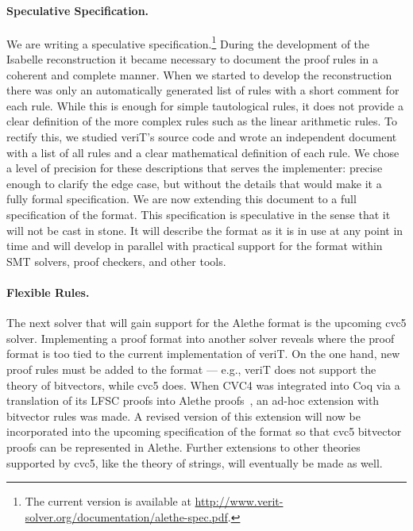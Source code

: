 \documentclass[submission,copyright,creativecommons]{eptcs}
\begin{document}
\paragraph{Speculative Specification.}

We are writing a speculative specification.\footnote{The current
version is available at
\url{http://www.verit-solver.org/documentation/alethe-spec.pdf}.}
During the development of the Isabelle reconstruction it became necessary
to document the proof rules in a coherent and complete manner.  When we
started to develop the reconstruction there was only an automatically
generated list of rules with a short comment for each rule. While
this is enough for simple tautological rules, it does not provide a clear
definition of the more complex rules such as the linear arithmetic rules.
%
To rectify this, we studied veriT's source code and wrote an independent
document with a list of all rules and a clear mathematical definition
of each rule.
%
We chose a
level of precision for these descriptions that serves the implementer:
precise enough to clarify the edge case, but without the details that would make it a fully formal specification.
We are now extending this document to a full specification of the format.
This specification is speculative in the sense that it will not be cast
in stone. It will describe the format as it is in use
at any point in time and will develop in parallel with practical support for the
format within SMT solvers, proof checkers, and other tools.

\paragraph{Flexible Rules.}

The next solver that will gain support for the Alethe format is the upcoming
cvc5 solver. Implementing a proof format into another solver reveals where the
proof format is too tied to the current implementation of veriT. On the one
hand, new proof rules must be added to the format --- e.g., veriT does not
support the theory of bitvectors, while cvc5 does.
%
When CVC4 was integrated into Coq via a translation of its LFSC proofs into
Alethe proofs~\cite{SMTCoq}, an ad-hoc extension with bitvector rules was
made. A revised version of this extension will now be incorporated into the
upcoming specification of the format so that cvc5 bitvector proofs can be
represented in Alethe.
%
Further extensions to other theories supported by cvc5, like the theory of
strings, will eventually be made as well.
\end{document}
